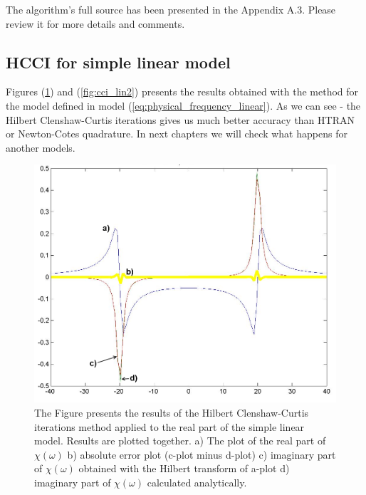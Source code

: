 \documentclass[12pt,twoside,a4paper]{article}
\def\emptyline{\vspace{12pt}}
\numberwithin{equation}{subsection}
\numberwithin{figure}{subsection}
\begin{document}
\emptyline

The algorithm's full source has been presented in the Appendix A.3. Please review it for more details and comments.

\subsection{HCCI for simple linear model} \label{chap:hcc_lin}

Figures (\ref{fig:cci_lin1}) and (\ref{fig:cci_lin2}) presents the results obtained with the method for the model defined in model (\ref{eq:physical_frequency_linear}). As we can see - the Hilbert Clenshaw-Curtis iterations gives us much better accuracy than HTRAN or Newton-Cotes quadrature. In next chapters we will check what happens for another models.

\begin{figure} 
  \includegraphics[width=150mm]{img/hcc_lin1.png}
  \caption{The Figure presents the results of the Hilbert Clenshaw-Curtis iterations method applied to the real part of the simple linear model. Results are plotted together.
   a) The plot of the real part of $\chi (\omega )$ 
   b) absolute error plot (c-plot minus d-plot) 
   c) imaginary part of $\chi (\omega )$ obtained with the Hilbert transform of a-plot 
   d) imaginary part of $\chi (\omega )$  calculated analytically. \label{fig:cci_lin1}
  }
\end{figure}
\end{document}
